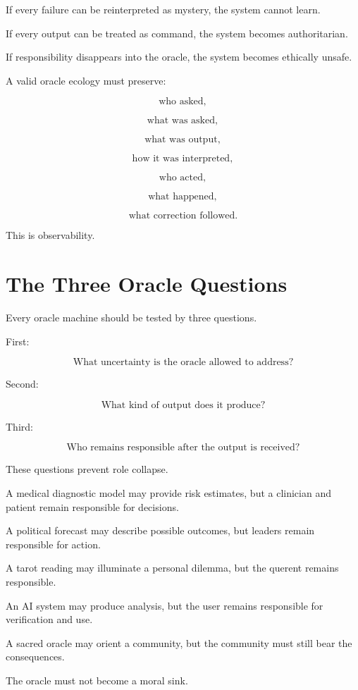 \documentclass[11pt]{book}
\begin{document}
If every failure can be reinterpreted as mystery, the system cannot learn.

If every output can be treated as command, the system becomes authoritarian.

If responsibility disappears into the oracle, the system becomes ethically unsafe.

A valid oracle ecology must preserve:

\[
\text{who asked},
\]

\[
\text{what was asked},
\]

\[
\text{what was output},
\]

\[
\text{how it was interpreted},
\]

\[
\text{who acted},
\]

\[
\text{what happened},
\]

\[
\text{what correction followed}.
\]

This is observability.

\section{The Three Oracle Questions}

Every oracle machine should be tested by three questions.

First:

\[
\text{What uncertainty is the oracle allowed to address?}
\]

Second:

\[
\text{What kind of output does it produce?}
\]

Third:

\[
\text{Who remains responsible after the output is received?}
\]

These questions prevent role collapse.

A medical diagnostic model may provide risk estimates, but a clinician and patient remain responsible for decisions.

A political forecast may describe possible outcomes, but leaders remain responsible for action.

A tarot reading may illuminate a personal dilemma, but the querent remains responsible.

An AI system may produce analysis, but the user remains responsible for verification and use.

A sacred oracle may orient a community, but the community must still bear the consequences.

The oracle must not become a moral sink.
\end{document}
